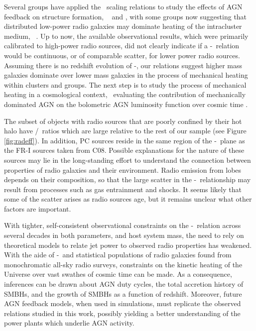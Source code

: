 \documentclass{emulateapj}
\begin{document}
Several groups have applied the \birzan\ scaling relations to study
the effects of AGN feedback on structure formation,
\eg\ \citet{best07} and \citet{2007MNRAS.379..260M}, with some groups
now suggesting that distributed low-power radio galaxies may dominate
heating of the intracluster medium,
\eg\ \citet{2009ApJ...705..854H}. Up to now, the available
observational results, which were primarily calibrated to high-power
radio sources, did not clearly indicate if a \pjet-\prad\ relation
would be continuous, or of comparable scatter, for lower power radio
sources. Assuming there is no redshift evolution of \pjet-\prad, our
relations suggest higher mass galaxies dominate over lower mass
galaxies in the process of mechanical heating within clusters and
groups. The next step is to study the process of mechanical heating in
a cosmological context, \eg\ evaluating the contribution of
mechanically dominated AGN on the bolometric AGN luminosity function
over cosmic time \citep[\ie][]{2009MNRAS.395..518C}.

The subset of objects with radio sources that are poorly confined by
their hot halo have \pjet/\prad\ ratios which are large relative to
the rest of our sample (see Figure \ref{fig:radeff}). In addition, PC
sources reside in the same region of the \pjet-\prad\ plane as the
FR-I sources taken from C08. Possible explanations for the nature of
these sources may lie in the long-standing effort to understand the
connection between properties of radio galaxies and their
environment. Radio emission from lobes depends on their composition,
so that the large scatter in the \pjet-\prad\ relationship may result
from processes such as gas entrainment and shocks. It seems likely
that some of the scatter arises as radio sources age, but it remains
unclear what other factors are important.

With tighter, self-consistent observational constraints on the
\pjet-\prad\ relation across several decades in both parameters, and
host system mass, the need to rely on theoretical models to relate jet
power to observed radio properties has weakened. With the aide of
\pjet-\prad\ and statistical populations of radio galaxies found from
monochromatic all-sky radio surveys, constraints on the kinetic
heating of the Universe over vast swathes of cosmic time can be made.
As a consequence, inferences can be drawn about AGN duty cycles, the
total accretion history of SMBHs, and the growth of SMBHs as a
function of redshift. Moreover, future AGN feedback models, when used
in simulations, must replicate the observed relations studied in this
work, possibly yielding a better understanding of the power plants
which underlie AGN activity.
\end{document}
